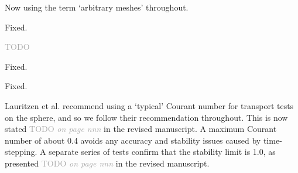 \documentclass[times]{elsarticle}
\newcommand{\TODO}[1]{\textcolor{darkgray}{TODO \textit{#1}}}
\begin{document}
\begin{quotation}
\begin{comment}
\item  p.5, first paragraph: Is it "arbitrary meshes" or "arbitrary
    structured meshes"?
\end{comment}
\end{quotation}
Now using the term `arbitrary meshes' throughout.

\begin{quotation}
\begin{comment}
\item  p.5, last paragraph of Section 2.1.1.: "dirichlet" should be
    upper case "Dirichlet".
\end{comment}
\end{quotation}
Fixed.

\begin{quotation}
\begin{comment}
\item p.7, caption of Fig. 3, last sentence: It is stated that a
    von Neumann boundary condition is assumed. However, the
    footnote on p.5 says that Neumann BCs are excluded from the
    set of stencil boundary faces?
\end{comment}
\end{quotation}
\TODO{}

\begin{quotation}
\begin{comment}
\item p.9, caption of Fig. 4, first sentence: "A one-dimensional
    least squares fits" should probably read "One-dimensional
    least squares fits".
\end{comment}
\end{quotation}
Fixed.

\begin{quotation}
\begin{comment}
\item p.12, caption of Fig. 6, last but one sentence: "domain is
    shown" instead of "domain in shown".
\end{comment}
\end{quotation}
Fixed.

\begin{quotation}
\begin{comment}
\item Section 3: Why are most of the experiments run with maximum CFL
    numbers < 0.5 or even < 0.4, although the cubic-fit scheme
    permits a maximum CFL < 1 (Fig. 10)? Is this because the upwind
    scheme, to which cubic-fit is compared to, is more limited with
    respect to the time step for the considered test cases?
\end{comment}
\end{quotation}
Lauritzen et al. \citep{lauritzen2012} recommend using a `typical' Courant number for transport tests on the sphere, and so we follow their recommendation throughout.  This is now stated \TODO{on page nnn} in the revised manuscript.
A maximum Courant number of about 0.4 avoids any accuracy and stability issues caused by time-stepping.
A separate series of tests confirm that the stability limit is 1.0, as presented \TODO{on page nnn} in the revised manuscript.
\end{document}
